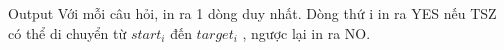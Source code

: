 Output
Với mỗi câu hỏi, in ra 1 dòng duy nhất. Dòng thứ i in ra YES nếu TSZ có thể di chuyển từ $start_{i}$ đến $target_{i}$ , ngược lại in ra NO.